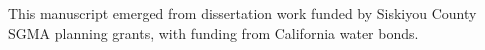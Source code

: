\documentclass[hess, manuscript]{copernicus}
\begin{document}





\begin{acknowledgements}
This manuscript emerged from dissertation work funded by Siskiyou County
SGMA planning grants, with funding from California water bonds.
\end{acknowledgements}







\end{document}
